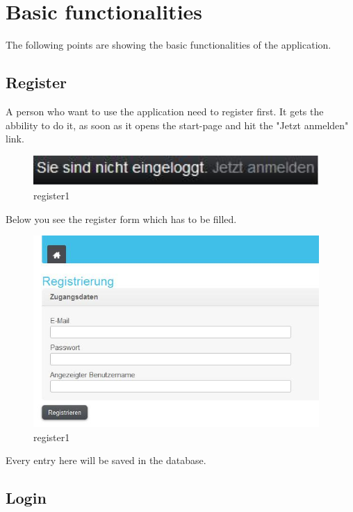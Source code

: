 \section{Basic functionalities}
The following points are showing the basic functionalities of the application.
\subsection{Register}
A person who want to use the application need to register first. It gets the abbility to do it, as soon as it opens the start-page and hit the "Jetzt anmelden" link.
\begin{figure}[!ht]
  \centering
    \includegraphics[width=0.97\textwidth]{images/basic_functionalities/reg1.jpg}
  \caption{register1}
  \label{fig:register1}
\end{figure}

Below you see the register form which has to be filled.
\begin{figure}[!ht]
  \centering
    \includegraphics[width=0.97\textwidth]{images/basic_functionalities/register_form.jpg}
  \caption{register1}
  \label{fig:register1}
\end{figure}

Every entry here will be saved in the database.

\subsection{Login}

